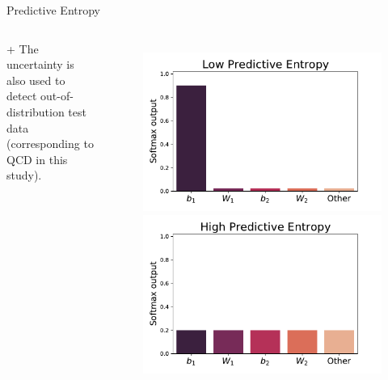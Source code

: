 \begin{frame}[fragile]{Predictive Entropy}
\begin{columns}[T,onlytextwidth]
    + The uncertainty is also used to detect out-of-distribution test data (corresponding to QCD in this study).
    \begin{figure}
      \centering
      \includegraphics[width=\textwidth]{fig/entropy-example/entropy-low.pdf}
      \includegraphics[width=\textwidth]{fig/entropy-example/entropy-high.pdf}

\end{figure}
\end{columns}
\end{frame}
